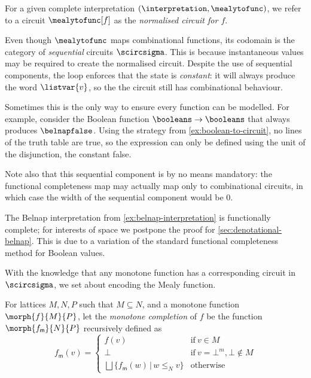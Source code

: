 For a given complete interpretation \((\interpretation,\mealytofunc)\), we refer
to a circuit \(\mealytofunc[f]\) as the \emph{normalised circuit for \(f\)}.\

\begin{remark}
    Even though \(\mealytofunc\) maps combinational functions, its codomain is
    the category of \emph{sequential} circuits \(\scircsigma\).
    This is because instantaneous values may be required to create the
    normalised circuit.
    Despite the use of sequential components, the loop enforces that the state
    is \emph{constant}: it will always produce the word \(\listvar{v}\), so the
    the circuit still has combinational behaviour.

    Sometimes this is the only way to ensure every function can be modelled.
    For example, consider the Boolean function \(\booleans \to \booleans\) that
    always produces \(\belnapfalse\).
    Using the strategy from \cref{ex:boolean-to-circuit}, no lines of the truth
    table are true, so the expression can only be defined using the unit of the
    disjunction, the constant false.

    Note also that this sequential component is by no means mandatory: the
    functional completeness map may actually map only to combinational circuits,
    in which case the width of the sequential component would be \(0\).
\end{remark}

\begin{example}
    The Belnap interpretation from \cref{ex:belnap-interpretation} is
    functionally complete; for interests of space we postpone the proof for
    \cref{sec:denotational-belnap}.
    This is due to a variation of the standard functional
    completeness method for Boolean values.
\end{example}

With the knowledge that any monotone function has a corresponding circuit
in \(\scircsigma\), we set about encoding the Mealy function.

\begin{definition}\label{def:monotone-completion}
    For lattices \(M, N, P\) such that \(M \subseteq N\), and a monotone
    function \(\morph{f}{M}{P}\), let the \emph{monotone completion} of \(f\) be
    the function \(\morph{f_\mathsf{m}}{N}{P}\) recursively defined as \[
        f_\mathsf{m}(v) = \begin{cases}
            f(v)
             &
            \text{if}\ v \in M
            \\
            \bot
             &
            \text{if}\ v = \bot^m, \bot \not\in M
            \\
            \bigsqcup \{ f_\mathsf{m}(w) \,|\, w \leq_N v \}
             &
            \text{otherwise}
        \end{cases}
    \]
\end{definition}

